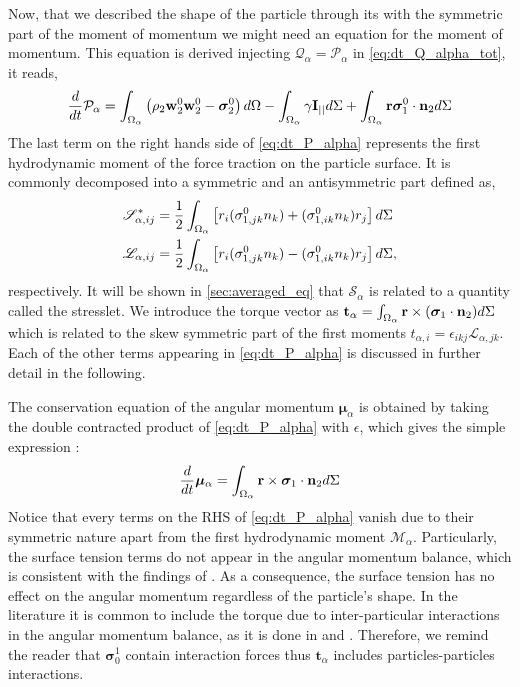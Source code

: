 Now, that we described the shape of the particle through its with the symmetric part of the moment of momentum we might need an equation for the moment of momentum. 
This equation is derived injecting $\mathcal{Q}_\alpha = \mathcal{P}_\alpha$ in \ref{eq:dt_Q_alpha_tot}, it reads, 
\begin{equation}
    \frac{d}{d t} {\mathcal{P}_\alpha}
    = \int_{\Omega_\alpha}  \left(
        \rho_2  \textbf{w}_2^0 \textbf{w}_2^0 
        - \bm{\sigma}_2^0
    \right)  d\Omega
    - \int_{\Omega_\alpha}  
        \gamma \textbf{I}_{||}
     d\Sigma
    + \int_{\Omega_\alpha}  \textbf{r}\bm{\sigma}_1^0\cdot \textbf{n}_2 d\Sigma 
    \label{eq:dt_P_alpha}
\end{equation}
The last term on the right hands side of \ref{eq:dt_P_alpha} represents the first hydrodynamic moment of the force traction on the particle surface.
It is commonly  decomposed into a symmetric and an antisymmetric part defined as, 
\begin{align}
    \label{eq:M_decomposition}
    \mathscr{S}_{\alpha,ij}^*
    &= \frac{1}{2}  \int_{\Omega_\alpha}  \left[
        r_i(\sigma_{1,jk}^0 n_k)
        + (\sigma_{1,ik}^0 n_k)r_j
        \right] d\Sigma
    \\
    \mathscr{L}_{\alpha,ij}
    &= \frac{1}{2}  \int_{\Omega_\alpha}  \left[
        r_i(\sigma_{1,jk}^0 n_k)
        - (\sigma_{1,ik}^0 n_k)r_j
    \right] d\Sigma, \nonumber
\end{align}
respectively. 
It will be shown in \ref{sec:averaged_eq} that $\mathscr{S}_\alpha$ is related to a quantity called the stresslet. 
We introduce the torque vector as $\textbf{t}_\alpha = \int_{\Omega_\alpha}  \textbf{r} \times (\bm{\sigma}_1\cdot \textbf{n}_2)  d\Sigma$ which is related to the skew symmetric part of the first moments $t_{\alpha,i} = \epsilon_{ikj} \mathscr{L}_{\alpha,jk}$. 
Each of the other terms appearing in \ref{eq:dt_P_alpha} is discussed in further detail in the following.
 

The conservation equation of the angular momentum $\bm{\mu}_\alpha$ is obtained by taking the double contracted product of \ref{eq:dt_P_alpha} with $\epsilon$, which gives the simple expression :
\begin{equation}
    \frac{d}{d t}\bm{\mu}_\alpha
    =  
    \int_{\Omega_\alpha}  \textbf{r} \times \bm{\sigma}_1\cdot \textbf{n}_2  d\Sigma
    \label{eq:dt_mu_alpha}
\end{equation}
Notice that every terms on the RHS of \ref{eq:dt_P_alpha} vanish due to their symmetric nature apart from the first hydrodynamic moment $\mathcal{M}_\alpha$.
Particularly, the surface tension terms do not appear in the angular momentum balance, which is consistent with the findings of \citet{hesla1993note}. 
As a consequence, the surface tension has no effect on the angular momentum regardless of the particle's shape. 
In the literature it is common to include the torque due to inter-particular interactions in the angular momentum balance, as it is done in \citet{jackson1997locally} and \citet{zhang1997momentum}.
Therefore, we remind the reader that $\bm{\sigma}_0^1$ contain interaction forces thus $\textbf{t}_\alpha$ includes particles-particles interactions.


